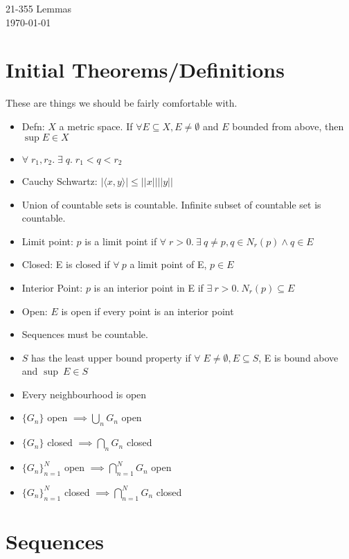 \documentclass[11pt]{article}
\begin{document}
\begin{center}
  {\LARGE 21-355 Lemmas} \\
    \today
\end{center}

\section{Initial Theorems/Definitions}
These are things we should be fairly comfortable with.
\begin{itemize}
\item Defn: $X$ a metric space. If $\forall E \subseteq X, E \neq \emptyset$
  and $E$ bounded from above, then $\sup E \in X$
\item $\forall\;r_1,r_2.\; \exists\;q.\; r_1 < q < r_2$
\item Cauchy Schwartz: $|\langle x, y \rangle| \leq ||x|| ||y||$
\item Union of countable sets is countable. Infinite subset of countable set is
  countable.
\item Limit point: $p$ is a limit point if $\forall\;r > 0.~\exists~q \neq p, q
  \in N_r(p) \land q \in E$
\item Closed: E is closed if $\forall~p$ a limit point of E, $p \in E$
\item Interior Point: $p$ is an interior point in E if $\exists~r > 0.~ N_r(p)
  \subseteq E$
\item Open: $E$ is open if every point is an interior point
\item Sequences must be countable.
\item $S$ has the least upper bound property if $\forall\;E \neq \emptyset, E
  \subseteq S$, E is bound above and $\sup~E \in S$
\item Every neighbourhood is open
\item $\{ G_n \}$ open $\implies \bigcup_n G_n$ open
\item $\{ G_n \}$ closed $\implies \bigcap_n G_n$ closed
\item $\{ G_n \}_{n=1}^{N}$ open $\implies \bigcap_{n = 1}^N G_n$ open
\item $\{ G_n \}_{n=1}^{N}$ closed $\implies \bigcap_{n = 1}^N G_n$ closed
\end{itemize}

\section{Sequences} %
\end{document}
